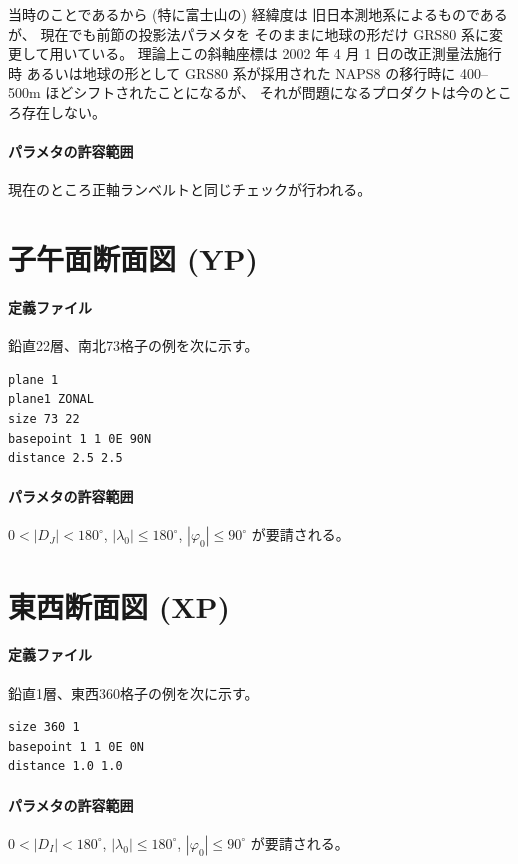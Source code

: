 当時のことであるから (特に富士山の) 経緯度は
旧日本測地系によるものであるが、
現在でも前節の投影法パラメタを
そのままに地球の形だけ GRS80 系に変更して用いている。
理論上この斜軸座標は 2002 年 4 月 1 日の改正測量法施行時
あるいは地球の形として GRS80 系が採用された NAPS8 の移行時に
400--500m ほどシフトされたことになるが、
それが問題になるプロダクトは今のところ存在しない。

\paragraph{パラメタの許容範囲}
現在のところ正軸ランベルトと同じチェックが行われる。

\section{子午面断面図 (YP)}
\paragraph{定義ファイル}
鉛直22層、南北73格子の例を次に示す。
\begin{screen}
\begin{verbatim}
plane 1
plane1 ZONAL
size 73 22
basepoint 1 1 0E 90N
distance 2.5 2.5
\end{verbatim}
\end{screen}
\paragraph{パラメタの許容範囲}
\(0 < |D_J| < 180^\circ\),
\(|\lambda_0| \le 180^\circ\),
\(|\varphi_0| \le 90^\circ\)
が要請される。

\section{東西断面図 (XP)}

\paragraph{定義ファイル}
鉛直1層、東西360格子の例を次に示す。
\begin{screen}
\begin{verbatim}
size 360 1
basepoint 1 1 0E 0N
distance 1.0 1.0
\end{verbatim}
\end{screen}
\paragraph{パラメタの許容範囲}
\(0 < |D_I| < 180^\circ\),
\(|\lambda_0| \le 180^\circ\),
\(|\varphi_0| \le 90^\circ\)
が要請される。

